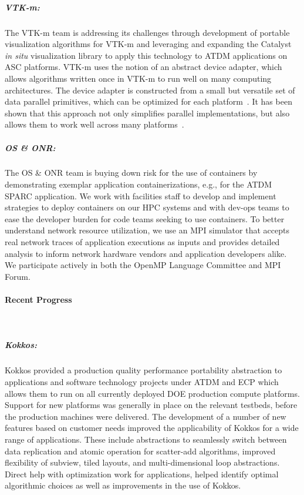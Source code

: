 \subparagraph{VTK-m:} The VTK-m team is addressing its challenges through
development of portable visualization algorithms for VTK-m and leveraging and
expanding the Catalyst~\cite{Catalyst}  \emph{in situ} visualization library to
apply this technology to ATDM applications on ASC platforms.  VTK-m uses the
notion of an abstract device adapter, which allows algorithms written once in
VTK-m to run well on many computing architectures.  The device adapter is
constructed from a small but versatile set of data parallel primitives, which
can be optimized for each platform~\cite{Blelloch1990}.  It has been shown that
this approach not only simplifies parallel implementations, but also allows
them to work well across many platforms~\cite{Lo2012,Larsen2015,Moreland2015}.

\subparagraph{OS \& ONR:} The OS \& ONR team is buying down risk for the use of containers by demonstrating exemplar application containerizations, e.g., for the ATDM SPARC application.  We work with facilities staff to develop and implement strategies to deploy containers on our HPC systems and with dev-ops teams to ease the developer burden for code teams seeking to use containers.  To better understand network resource utilization, we use an MPI simulator that accepts real network traces of application executions as inputs and provides detailed analysis to inform network hardware vendors and application developers alike.  We participate actively in both the OpenMP Language Committee and MPI Forum.



\paragraph{Recent Progress} \leavevmode \\


\subparagraph{Kokkos:}  Kokkos provided a production quality performance portability abstraction to applications and software technology projects under ATDM and ECP which allows them to run on all currently deployed DOE production compute platforms. Support for new platforms was generally in place on the relevant testbeds, before the production machines were delivered.   The development of a number of new features based on customer needs improved the applicability of Kokkos for a wide range of applications. These include abstractions to seamlessly switch between data replication and atomic operation for scatter-add algorithms, improved flexibility of subview, tiled layouts, and multi-dimensional loop abstractions.  Direct help with optimization work for applications, helped identify optimal algorithmic choices as well as improvements in the use of Kokkos.


